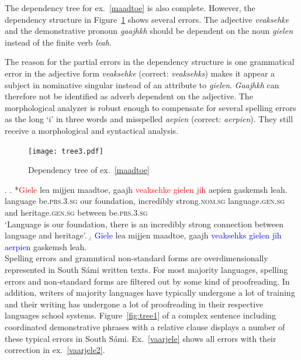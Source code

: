 \documentclass[free]{flammie}
\begin{document}
The dependency tree for ex.~\ref{maadtoe} is also complete. However, the
dependency structure in Figure~\ref{fig:cfvghbjnk} shows several errors. The
adjective \textit{veaksehke} and the demonstrative pronoun \textit{gaajhkh}
should be dependent on the noun \textit{gielen} instead of the finite verb
\textit{leah}.

The reason for the partial errors in the dependency structure is one grammatical
error in the adjective form \textit{veaksehke} (correct: \textit{veaksehks})
makes it appear a subject in nominative singular instead of an attribute to
\textit{gielen}. \textit{Gaajhkh} can therefore not be identified as adverb
dependent on the adjective. The morphological analyzer is robust enough to
compensate for several spelling errors as the long `i' in three words and
misspelled \textit{aepien} (correct: \textit{aerpien}). They still receive a
morphological and syntactical analysis.


\begin{figure}
    \centering
    \texttt{[image: tree3.pdf]}
    \caption{Dependency tree of ex.~\ref{maadtoe}\label{fig:cfvghbjnk}}
\end{figure}

\ex.
\ag. *\textcolor{red}{Giele} lea mijjen maadtoe, gaajh
\textcolor{red}{veaksehke} \textcolor{red}{gielen} \textcolor{red}{jih} aepien
gaskemsh leah.\label{maadtoe}\\
language be\textsc{.prs.3.sg} our foundation, incredibly strong\textsc{.nom.sg}
language\textsc{.gen.sg} and heritage\textsc{.gen.sg} between
be\textsc{.prs.3.sg}\\
`Language is our foundation, there is an incredibly strong connection between
language and heritage'.
\b. \textcolor{blue}{Gïele} lea mijjen maadtoe, gaajh
\textcolor{blue}{veaksehks} \textcolor{blue}{gïelen} \textcolor{blue}{jïh}
\textcolor{blue}{aerpien} gaskemsh leah.\\


Spelling errors and grammtical non-standard forms are overdimensionally
represented in South Sámi written texts. For most majority languages, spelling
errors and non-standard forms are filtered out by some kind of proofreading. In
addition, writers of majority languages have typically undergone a lot of
training and their writing has undergone a lot of proofreading in their
respective languages school systems.  Figure~\ref{fig:tree1} of a complex
sentence including coordinated demonstrative phrases with a relative clause
displays a number of these typical errors in South Sámi.  Ex.~\ref{vaarjele}
shows all errors with their correction in ex.~\ref{vaarjele2}.
\end{document}
